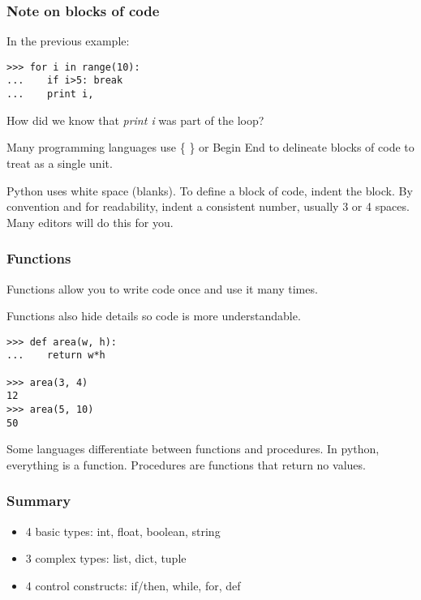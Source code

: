 \documentclass[10pt]{beamer}
\begin{document}
\begin{frame}[fragile]
\frametitle{Note on blocks of code}

In the previous example:
\begin{verbatim}
>>> for i in range(10):
...    if i>5: break
...    print i,
\end{verbatim}

How did we know that \textit{print i} was part of the loop?

Many programming languages use \{ \} or Begin End to delineate blocks of
code to treat as a single unit.

Python uses white space (blanks).  To define a block of code, indent the block.
By convention and for readability, indent a consistent number, 
usually 3 or 4 spaces.  Many editors will do this for you.

\end{frame}

\begin{frame}[fragile]
\frametitle{Functions}

Functions allow you to write code once and use it many times.
\vspace{2mm}

Functions also hide details so code is more understandable.
\begin{verbatim}
>>> def area(w, h):
...    return w*h

>>> area(3, 4)
12
>>> area(5, 10)
50
\end{verbatim}

Some languages differentiate between functions and procedures.  In python, everything is a function.
Procedures are functions that return no values.

\end{frame}

\begin{frame}[fragile]
\frametitle{Summary}
\begin{itemize}
\item 4 basic types: int, float, boolean, string
\item 3 complex types: list, dict, tuple
\item 4 control constructs: if/then, while, for, def
\end{itemize}
\end{frame}
\end{document}
